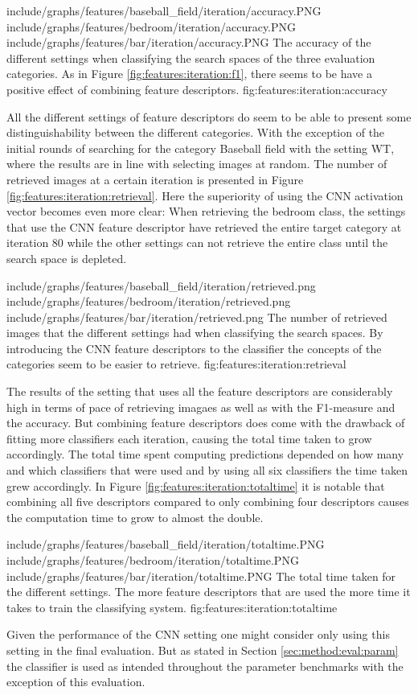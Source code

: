 \tripfigurenear
{include/graphs/features/baseball_field/iteration/accuracy.PNG}
{include/graphs/features/bedroom/iteration/accuracy.PNG}
{include/graphs/features/bar/iteration/accuracy.PNG}
{The accuracy of the different settings when classifying the search spaces of the three evaluation categories. As in Figure \ref{fig:features:iteration:f1}, there seems to be have a positive effect of combining feature descriptors.}
{fig:features:iteration:accuracy}


All the different settings of feature descriptors do seem to be able to present some distinguishability between the different categories. With the exception of the initial rounds of searching for the category Baseball field with the setting WT, where the results are in line with selecting images at random. The number of retrieved images at a certain iteration is presented in Figure \ref{fig:features:iteration:retrieval}. Here the superiority of using the CNN activation vector becomes even more clear: When retrieving the bedroom class, the settings that use the CNN feature descriptor have retrieved the entire target category at iteration 80 while the other settings can not retrieve the entire class until the search space is depleted. 

\tripfigurenear
{include/graphs/features/baseball_field/iteration/retrieved.png}
{include/graphs/features/bedroom/iteration/retrieved.png}
{include/graphs/features/bar/iteration/retrieved.png}
{The number of retrieved images that the different settings had when classifying the search spaces. By introducing the CNN feature descriptors to the classifier the concepts of the categories seem to be easier to retrieve.}
{fig:features:iteration:retrieval}


The results of the setting that uses all the feature descriptors are considerably high in terms of pace of retrieving imagaes as well as with the F1-measure and the accuracy. But combining feature descriptors does come with the drawback of fitting more classifiers each iteration, causing the total time taken to grow accordingly.
The total time spent computing predictions depended on how many and which classifiers that were used and by using all six classifiers the time taken grew accordingly. In Figure \ref{fig:features:iteration:totaltime} it is notable that combining all five descriptors compared to only combining four descriptors causes the computation time to grow to almost the double. 

\tripfigure
{include/graphs/features/baseball_field/iteration/totaltime.PNG}
{include/graphs/features/bedroom/iteration/totaltime.PNG}
{include/graphs/features/bar/iteration/totaltime.PNG}
{The total time taken for the different settings. The more feature descriptors that are used the more time it takes to train the classifying system.}
{fig:features:iteration:totaltime}

Given the performance of the CNN setting one might consider only using this setting in the final evaluation. But as stated in Section \ref{sec:method:eval:param} the classifier is used as intended throughout the parameter benchmarks with the exception of this evaluation. 

